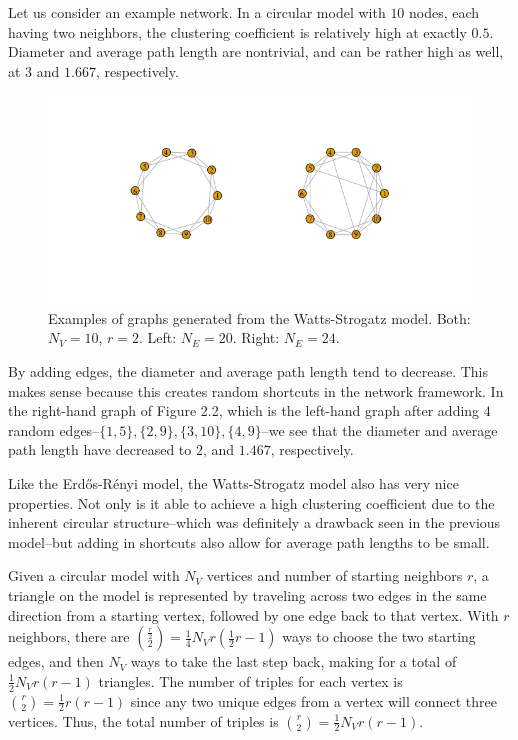 \documentclass[12pt,twoside]{amherstthesis}
\begin{document}
  Let us consider an example network. In a circular model with \(10\)
  nodes, each having two neighbors, the clustering coefficient is
  relatively high at exactly \(0.5\). Diameter and average path length are
  nontrivial, and can be rather high as well, at \(3\) and \(1.667\),
  respectively.
  
  \begin{figure}[htbp]
  \centering
  \includegraphics{figure/22wattsstrogatzexample.png}
  \caption{Examples of graphs generated from the Watts-Strogatz model.
  Both: \(N_V = 10\), \(r = 2\). Left: \(N_E = 20\). Right: \(N_E = 24\).}
  \end{figure}
  
  By adding edges, the diameter and average path length tend to decrease.
  This makes sense because this creates random shortcuts in the network
  framework. In the right-hand graph of Figure 2.2, which is the left-hand
  graph after adding \(4\) random
  edges--\(\{1, 5\}, \{2, 9\}, \{3, 10\}, \{4, 9\}\)--we see that the
  diameter and average path length have decreased to \(2\), and \(1.467\),
  respectively.
  
  Like the Erdős-Rényi model, the Watts-Strogatz model also has very nice
  properties. Not only is it able to achieve a high clustering coefficient
  due to the inherent circular structure--which was definitely a drawback
  seen in the previous model--but adding in shortcuts also allow for
  average path lengths to be small.
  
  Given a circular model with \(N_{V}\) vertices and number of starting
  neighbors \(r\), a triangle on the model is represented by traveling
  across two edges in the same direction from a starting vertex, followed
  by one edge back to that vertex. With \(r\) neighbors, there are
  \({\frac {r} {2} \choose 2} = \frac {1} {4} N_{V} r \left(\frac {1} {2} r - 1 \right)\)
  ways to choose the two starting edges, and then \(N_V\) ways to take the
  last step back, making for a total of \(\frac {1} {2} N_{V} r(r - 1)\)
  triangles. The number of triples for each vertex is
  \({r \choose 2} = \frac {1} {2}r(r - 1)\) since any two unique edges
  from a vertex will connect three vertices. Thus, the total number of
  triples is \({r \choose 2} = \frac {1} {2}N_{V}r(r - 1)\).
  
\end{document}
